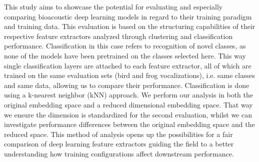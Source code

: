 This study aims to showcase the potential for evaluating and especially comparing bioacoustic deep learning models in regard to their training paradigm and training data.
This evaluation is based on the structuring capabilities of their respective feature extractors analyzed through clustering and classification performance.
Classification in this case refers to recognition of novel classes, as none of the models have been pretrained on the classes selected here.
This way single classification layers are attached to each feature extractor, all of which are trained on the same evaluation sets (bird and frog vocalizations), i.e. same classes and same data, allowing us to compare their performance.
Classification is done using a k-nearest neighbor (kNN) approach.
We perform our analysis in both the original embedding space and a reduced dimensional embedding space. 
That way we ensure the dimension is standardized for the second evaluation, whilst we can investigate performance differences between the original embedding space and the reduced space.
This method of analysis opens up the possibilities for a fair comparison of deep learning feature extractors guiding the field to a better understanding how training configurations affect downstream performance.




